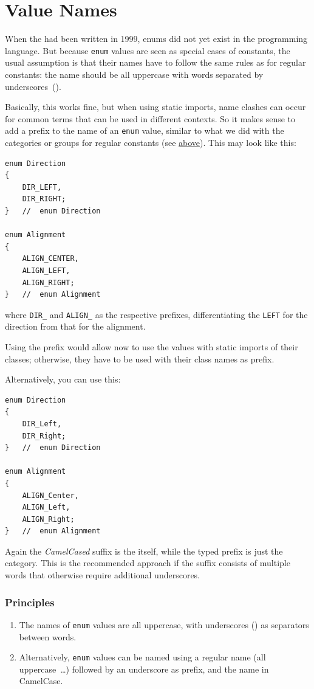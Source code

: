 \section{ Value Names}\label{sec:EnumValues}
When the \ccjpl had been written in 1999, enums did not yet exist in the programming language. But because \lstinline|enum| values are seen as special cases of constants, the usual assumption is that their names have to follow the same rules as for regular constants: the name should be all uppercase with words separated by underscores~(\bdq{\texttt{\_}}).

Basically, this works fine, but when using static imports, name clashes can occur for common terms that can be used in different contexts. So it makes sense to add a prefix to the name of an \lstinline|enum| value, similar to what we did with the categories or groups for regular constants (see \hyperref[sec:Constants]{above}). This may look like this:
\begin{lstlisting}
enum Direction
{
    DIR_LEFT,
    DIR_RIGHT;
}   //  enum Direction

enum Alignment
{
    ALIGN_CENTER,
    ALIGN_LEFT,
    ALIGN_RIGHT;
}   //  enum Alignment
\end{lstlisting}
where \lstinline|DIR_| and \lstinline|ALIGN_| as the respective prefixes, differentiating the \texttt{LEFT} for the direction from that for the alignment.

Using the prefix would allow now to use the values with static imports of their classes; otherwise, they have to be used with their class names as prefix.

Alternatively, you can use this:
\begin{lstlisting}
enum Direction
{
    DIR_Left,
    DIR_Right;
}   //  enum Direction

enum Alignment
{
    ALIGN_Center,
    ALIGN_Left,
    ALIGN_Right;
}   //  enum Alignment
\end{lstlisting}
Again the \textit{CamelCased} suffix is the  itself, while the  typed prefix is just the category. This is the recommended approach if the suffix consists of multiple words that otherwise require additional underscores.

\subsubsection{Principles}
\begin{enumerate}[label=P\arabic*.]
	\item{The names of \lstinline|enum| values are all uppercase, with underscores (\bdq{\texttt{\_}}) as separators between words.}
	
	\item{Alternatively, \lstinline|enum| values can be named using a regular name (all uppercase~…) followed by an underscore as prefix, and the name in CamelCase.}
\end{enumerate}

